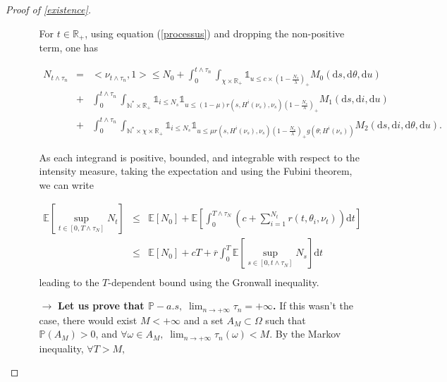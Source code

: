 \documentclass[a4paper,11pt]{article}
\newcommand{\E}{\mathbb{E}}
\newcommand{\dx}{\textrm{d}}
\begin{document}
\begin{proof}[Proof of \ref{existence}]
\begin{enumerate}
\begin{itemize}
For $t\in\mathbb{R}_+$, using equation (\ref{processus}) and dropping the non-positive term, one has

\begin{eqnarray*}
N_{t\wedge \tau_n} &=& <\nu_{t\wedge \tau_n},1> \leq  N_0 + \int_{0}^{t\wedge \tau_n} \int_{\chi \times \mathbb{R}_+} \mathds{1}_{u \leq c\times (1-\frac{N_s}{\lambda})_+}  M_0(\dx s,\dx \theta,\dx u) \\
&+& \int_{0}^{t\wedge \tau_n} \int_{\mathbb{N}^* \times \mathbb{R}_+}  \mathds{1}_{i \leq N_{s}} \mathds{1}_{u \leq (1- \mu)r(s,H^i(\nu_{s}),\nu_s)(1-\frac{N_s}{\lambda})_+} M_1(\dx s,\dx i,\dx u) \\  
&+& \int_{0}^{t\wedge \tau_n}\int_{\mathbb{N}^* \times \chi \times \mathbb{R}_+}  \mathds{1}_{i \leq N_{s}}  \mathds{1}_{u \leq \mu r(s,H^i(\nu_{s}),\nu_s)(1-\frac{N_s}{\lambda})_+  g( \theta; H^i(\nu_{s}))} M_2(\dx s,\dx i,\dx \theta,\dx u).
\end{eqnarray*}

As each integrand is positive, bounded, and integrable with respect to the intensity measure, taking the expectation and using the Fubini theorem, we can write

\begin{eqnarray}\label{inequality1}
\mathbb{E}\left[\sup_{t\in [0,T\wedge \tau_N]}N_t\right] &\leq & \mathbb{E}[N_0] + \E\left[\int_{0}^{T\wedge \tau_N} \left( c + \sum_{i=1}^{N_t} r(t,\theta_i,\nu_t) \right)\dx t \right]  \nonumber\\
&\leq & \mathbb{E}[N_0] + cT + \overline{r} \int_{0}^{T} \E\left[\sup_{s\in [0,t\wedge \tau_N]}N_s\right] \dx t \nonumber\\
\end{eqnarray}
leading to the $T$-dependent bound using the Gronwall inequality. 

\item[$\rightarrow$] \boldmath \textbf{ Let us prove that $\mathbb{P}-a.s,\; \lim_{n\rightarrow +\infty} \tau_n = +\infty$.} \unboldmath If this wasn't the case, there would exist $M<+\infty$ and a set $A_M \subset \Omega$ such that $\mathbb{P}(A_M) >0$, and $\forall \omega \in A_M, \; \lim_{n\rightarrow +\infty} \tau_n(\omega) < M$. By the Markov inequality, $\forall T > M,$


\end{itemize}
\end{enumerate}
\end{proof}
\end{document}

